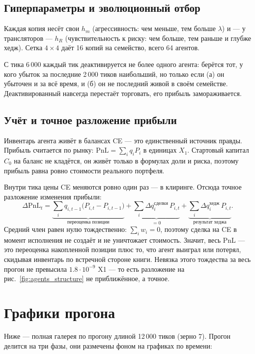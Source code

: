 \documentclass[11pt,a4paper]{article}
\begin{document}
\subsection{Гиперпараметры и эволюционный отбор}

Каждая копия несёт свои \(h_m\) (агрессивность: чем меньше, тем больше
\(\lambda\)) и --- у трансляторов --- \(h_R\) (чувствительность к риску: чем
больше, тем раньше и глубже хедж). Сетка \(4\times4\) даёт 16 копий на
семейство, всего 64 агентов.

С тика 6\,000 каждый тик деактивируется не более одного агента:
берётся тот, у кого убыток за последние 2\,000 тиков наибольший, но только
если (а) он убыточен и за всё время, и (б) он не последний живой в своём
семействе. Деактивированный навсегда перестаёт торговать, его прибыль
замораживается.

\subsection{Учёт и точное разложение прибыли}

Инвентарь агента живёт в балансах CE --- это единственный источник правды.
Прибыль считается по рынку: \(\mathrm{PnL} = \sum_i q_i P_i\) в единицах
\(X_1\). Стартовый капитал \(C_0\) на баланс не кладётся, он живёт только
в формулах доли и риска, поэтому прибыль равна ровно стоимости реального
портфеля.

Внутри тика цены CE меняются ровно один раз --- в клиринге. Отсюда точное
разложение изменения прибыли:
\[
  \Delta \mathrm{PnL}_t
  = \underbrace{\sum_i q_{i,t-1}\bigl(P_{i,t} - P_{i,t-1}\bigr)}
    _{\text{переоценка позиции}}
  + \underbrace{\sum_i \Delta q^{\text{сделки}}_{i}\,P_{i,t}}_{= 0}
  + \underbrace{\sum_i \Delta q^{\text{хедж}}_{i}\,P_{i,t}}
    _{\text{результат хеджа}} .
\]
Средний член равен нулю тождественно: \(\sum_i w_i = 0\), поэтому сделка на
CE в момент исполнения не создаёт и не уничтожает стоимость. Значит, весь
PnL --- это переоценка накопленной позиции плюс то, что агент выиграл или
потерял, скидывая инвентарь по встречной стороне книги. Невязка этого
тождества за весь прогон не превысила \(1.8\cdot 10^{-9}\) X1 --- то есть
разложение на рис.~\ref{fig:agents_structure} не приближённое, а точное.


\clearpage
\section{Графики прогона}

Ниже --- полная галерея по прогону длиной 12\,000 тиков (зерно 7).
Прогон делится на три фазы, они размечены фоном на графиках по времени:
\end{document}
